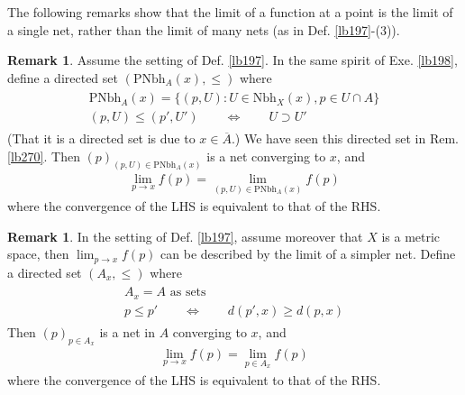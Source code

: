 \documentclass[12pt,b5paper,notitlepage]{article}
\theoremstyle{definition}
\newtheorem{rem}[df]{Remark}
\theoremstyle{plain}
\newcommand{\ovl}{\overline}
\newcommand{\Nbh}{\mathrm{Nbh}}
\newcommand{\Pnbh}{\mathrm{PNbh}}
\numberwithin{equation}{section}
\begin{document}
The following remarks show that the limit of a function at a point is the limit of a single net, rather than the limit of many nets (as in Def. \ref{lb197}-(3)).

\begin{rem}\label{lb275}
Assume the setting of Def. \ref{lb197}. In the same spirit of Exe. \ref{lb198}, define a directed set $(\Pnbh_A(x),\leq)$ where
\begin{gather}
\begin{gathered}
\Pnbh_A(x)=\big\{(p,U):U\in\Nbh_X(x),p\in U\cap A  \big\}\\[0.5ex]
(p,U)\leq(p',U')\qquad\Longleftrightarrow\qquad U\supset U'
\end{gathered}
\end{gather}
(That it is a directed set is due to $x\in \ovl A$.) We have seen this directed set in Rem. \ref{lb270}. Then $(p)_{(p,U)\in\Pnbh_A(x)}$ is a net converging to $x$, and
\begin{align}
\lim_{p\rightarrow x} f(p)=\lim_{(p,U)\in\Pnbh_A(x)}f(p)
\end{align}
where the convergence of the LHS is equivalent to that of the RHS.
\end{rem}

\begin{rem}\label{lb269}
In the setting of Def. \ref{lb197}, assume moreover that $X$ is a metric space, then $\lim_{p\rightarrow x}f(p)$ can be described by the limit of a simpler net. Define a directed set $(A_x,\leq)$ where
\begin{gather}
\begin{gathered}
A_x=A\text{ as sets}\\[0.5ex]
p\leq p'\qquad\Longleftrightarrow \qquad d(p',x)\geq d(p,x)
\end{gathered}
\end{gather}
Then $(p)_{p\in A_x}$ is a net in $A$ converging to $x$, and
\begin{align}
\lim_{p\rightarrow x} f(p)=\lim_{p\in A_x}f(p)
\end{align}
where the convergence of the LHS is equivalent to that of the RHS.
\end{rem}
\end{document}
